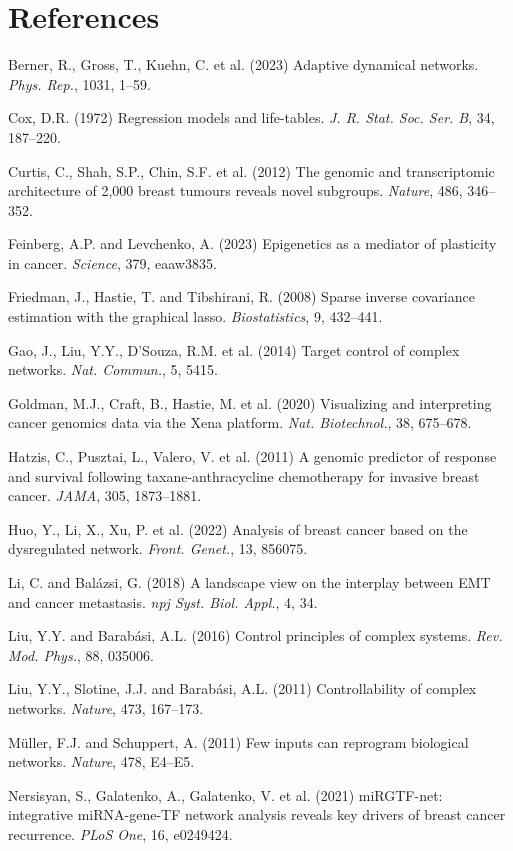 \documentclass[12pt]{article}
\begin{document}
\section*{References}

Berner, R., Gross, T., Kuehn, C. et al. (2023) Adaptive dynamical networks. \emph{Phys. Rep.}, 1031, 1--59.

Cox, D.R. (1972) Regression models and life-tables. \emph{J. R. Stat. Soc. Ser. B}, 34, 187--220.

Curtis, C., Shah, S.P., Chin, S.F. et al. (2012) The genomic and transcriptomic architecture of 2,000 breast tumours reveals novel subgroups. \emph{Nature}, 486, 346--352.

Feinberg, A.P. and Levchenko, A. (2023) Epigenetics as a mediator of plasticity in cancer. \emph{Science}, 379, eaaw3835.

Friedman, J., Hastie, T. and Tibshirani, R. (2008) Sparse inverse covariance estimation with the graphical lasso. \emph{Biostatistics}, 9, 432--441.

Gao, J., Liu, Y.Y., D'Souza, R.M. et al. (2014) Target control of complex networks. \emph{Nat. Commun.}, 5, 5415.

Goldman, M.J., Craft, B., Hastie, M. et al. (2020) Visualizing and interpreting cancer genomics data via the Xena platform. \emph{Nat. Biotechnol.}, 38, 675--678.

Hatzis, C., Pusztai, L., Valero, V. et al. (2011) A genomic predictor of response and survival following taxane-anthracycline chemotherapy for invasive breast cancer. \emph{JAMA}, 305, 1873--1881.

Huo, Y., Li, X., Xu, P. et al. (2022) Analysis of breast cancer based on the dysregulated network. \emph{Front. Genet.}, 13, 856075.

Li, C. and Bal\'azsi, G. (2018) A landscape view on the interplay between EMT and cancer metastasis. \emph{npj Syst. Biol. Appl.}, 4, 34.

Liu, Y.Y. and Barab\'asi, A.L. (2016) Control principles of complex systems. \emph{Rev. Mod. Phys.}, 88, 035006.

Liu, Y.Y., Slotine, J.J. and Barab\'asi, A.L. (2011) Controllability of complex networks. \emph{Nature}, 473, 167--173.

M\"uller, F.J. and Schuppert, A. (2011) Few inputs can reprogram biological networks. \emph{Nature}, 478, E4--E5.

Nersisyan, S., Galatenko, A., Galatenko, V. et al. (2021) miRGTF-net: integrative miRNA-gene-TF network analysis reveals key drivers of breast cancer recurrence. \emph{PLoS One}, 16, e0249424.
\end{document}
